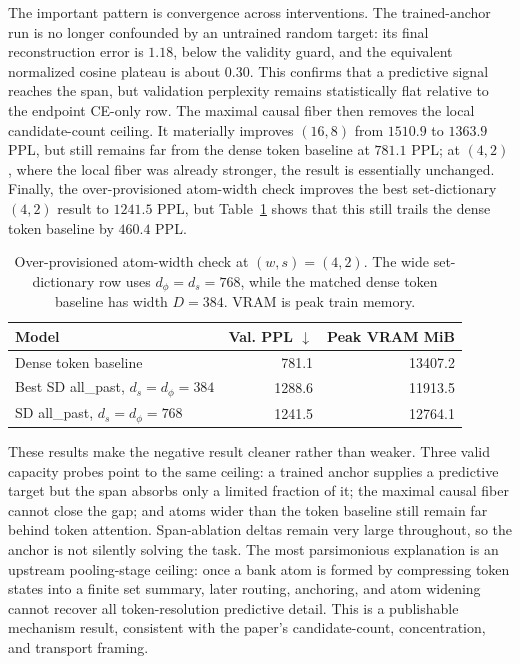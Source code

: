 \documentclass{article}
\theoremstyle{plain}
\theoremstyle{definition}
\theoremstyle{remark}
\begin{document}
The important pattern is convergence across interventions.  The trained-anchor
run is no longer confounded by an untrained random target: its final
reconstruction error is $1.18$, below the validity guard, and the equivalent
normalized cosine plateau is about $0.30$.  This confirms that a predictive
signal reaches the span, but validation perplexity remains statistically flat
relative to the endpoint CE-only row.  The maximal causal fiber then removes
the local candidate-count ceiling.  It materially improves $(16,8)$ from
$1510.9$ to $1363.9$ PPL, but still remains far from the dense token baseline
at $781.1$ PPL; at $(4,2)$, where the local fiber was already stronger, the
result is essentially unchanged.  Finally, the over-provisioned atom-width
check improves the best set-dictionary $(4,2)$ result to $1241.5$ PPL, but
Table~\ref{tab:sd-width-comparison} shows that this still trails the dense
token baseline by $460.4$ PPL.

\begin{table}[t]
\centering
\caption{Over-provisioned atom-width check at $(w,s)=(4,2)$.  The wide
set-dictionary row uses $d_\phi=d_s=768$, while the matched dense token
baseline has width $D=384$.  VRAM is peak train memory.}
\label{tab:sd-width-comparison}
\scriptsize
\begin{tabular}{lrr}
\toprule
Model & Val. PPL $\downarrow$ & Peak VRAM MiB \\
\midrule
Dense token baseline & 781.1 & 13407.2 \\
Best SD all\_past, $d_s=d_\phi=384$ & 1288.6 & 11913.5 \\
SD all\_past, $d_s=d_\phi=768$ & 1241.5 & 12764.1 \\
\bottomrule
\end{tabular}
\end{table}

These results make the negative result cleaner rather than weaker.  Three
valid capacity probes point to the same ceiling: a trained anchor supplies a
predictive target but the span absorbs only a limited fraction of it; the
maximal causal fiber cannot close the gap; and atoms wider than the token
baseline still remain far behind token attention.  Span-ablation deltas remain
very large throughout, so the anchor is not silently solving the task.  The
most parsimonious explanation is an upstream pooling-stage ceiling: once a bank
atom is formed by compressing token states into a finite set summary, later
routing, anchoring, and atom widening cannot recover all token-resolution
predictive detail.  This is a publishable mechanism result, consistent with
the paper's candidate-count, concentration, and transport framing.
\end{document}
